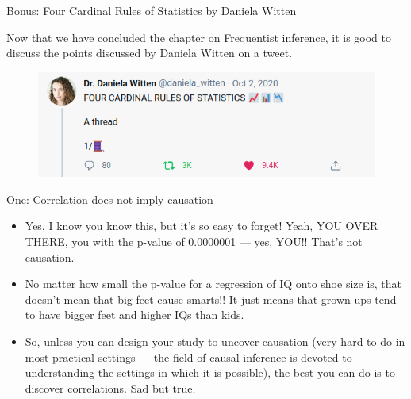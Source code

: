\documentclass[handout]{beamer}
\begin{document}
\begin{frame}{Bonus: Four Cardinal Rules of Statistics by Daniela Witten}
\scriptsize{

Now that we have concluded the chapter on Frequentist inference, it is good to discuss the points discussed by Daniela Witten on a tweet.

\begin{figure}[h!]
	\centering
	\includegraphics[scale=0.3]{pics/witten.png}
\end{figure}


\begin{block}{One: Correlation does not imply causation}
\begin{itemize}
 \item Yes, I know you know this, but it’s so easy to forget! Yeah, YOU OVER THERE, you with the p-value of 0.0000001 — yes, YOU!! That’s not causation.
 \item No matter how small the p-value for a regression of IQ onto shoe size is, that doesn’t mean that big feet cause smarts!!  It just means that grown-ups tend to have bigger feet and higher IQs than kids.
 \item So, unless you can design your study to uncover causation (very hard to do in most practical settings — the field of causal inference is devoted to understanding the settings in which it is possible), the best you can do is to discover correlations.  Sad but true.
\end{itemize}

 
\end{block}




} 
\end{frame}
\end{document}
